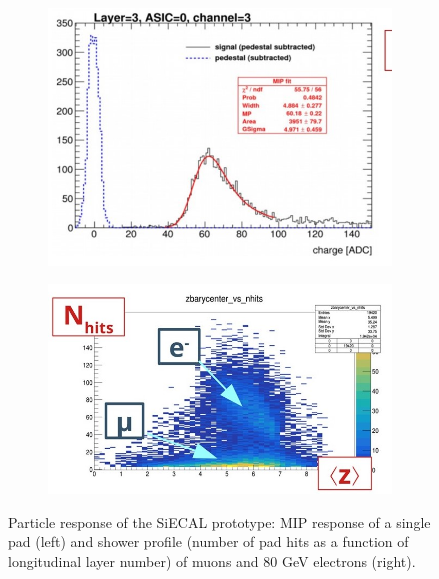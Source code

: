 \begin{figure}[t!]
\centering
\begin{subfigure}{0.48\textwidth}
\includegraphics[width=1.0\hsize]{Detector/fig/SiWECAL_signals_layer.jpg}
\caption{}
\end{subfigure}
\begin{subfigure}{0.48\textwidth}
\includegraphics[width=1.0\hsize]{Detector/fig/SiWECAL_signals_energy.jpg}
\caption{}
\end{subfigure}
\caption{Particle response of the SiECAL prototype: MIP response of a single pad (left) and shower profile (number of pad hits as a function of longitudinal layer number) of muons and 80 GeV electrons (right).}
\label{fig:det:SiWECAL_signals}
\end{figure}


